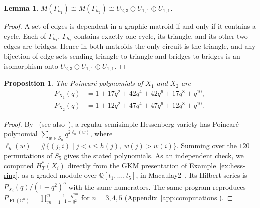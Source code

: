 \documentclass[11pt,a4paper]{article}
\numberwithin{equation}{section}
\theoremstyle{plain}
\newtheorem{lemma}[theorem]{Lemma}
\newtheorem{proposition}[theorem]{Proposition}
\theoremstyle{definition}
\theoremstyle{remark}
\newcommand{\Q}{\mathbb{Q}}
\newcommand{\C}{\mathbb{C}}
\newcommand{\HT}{H^{*}_{T}}
\DeclareMathOperator{\Fl}{Fl}
\begin{document}
\begin{lemma}\label{lem:iso-matroids}
$M(\Gamma_{h_1})\cong M(\Gamma_{h_2})\cong U_{2,3}\oplus U_{1,1}\oplus U_{1,1}$.
\end{lemma}
\begin{proof}
A set of edges is dependent in a graphic matroid if and only if it contains a cycle. Each of $\Gamma_{h_1}$, $\Gamma_{h_2}$ contains exactly one cycle, its triangle, and its other two edges are bridges. Hence in both matroids the only circuit is the triangle, and any bijection of edge sets sending triangle to triangle and bridges to bridges is an isomorphism onto $U_{2,3}\oplus U_{1,1}\oplus U_{1,1}$.
\end{proof}

\begin{proposition}\label{prop:betti}
The Poincaré polynomials of $X_1$ and $X_2$ are
\begin{align*}
P_{X_1}(q)&=1+17q^2+42q^4+42q^6+17q^8+q^{10},\\
P_{X_2}(q)&=1+12q^2+47q^4+47q^6+12q^8+q^{10}.
\end{align*}
\end{proposition}
\begin{proof}
By~\cite{DPS92} (see also~\cite{AH20}), a regular semisimple Hessenberg variety has Poincaré polynomial $\sum_{w\in S_n}q^{2\ell_h(w)}$, where $\ell_h(w)=\#\{(j,i)\mid j<i\leqslant h(j),\ w(j)>w(i)\}$. Summing over the $120$ permutations of $S_5$ gives the stated polynomials. As an independent check, we computed $\HT(X_i)$ directly from the GKM presentation of Example~\ref{ex:hess-ring}, as a graded module over $\Q[t_1,\dots,t_5]$, in Macaulay2~\cite{M2}. Its Hilbert series is $P_{X_i}(q)/(1-q^2)^5$ with the same numerators. The same program reproduces $P_{\Fl(\C^n)}=\prod_{m=1}^n\frac{1-q^{2m}}{1-q^2}$ for $n=3,4,5$ (Appendix~\ref{app:computations}).
\end{proof}
\end{document}
